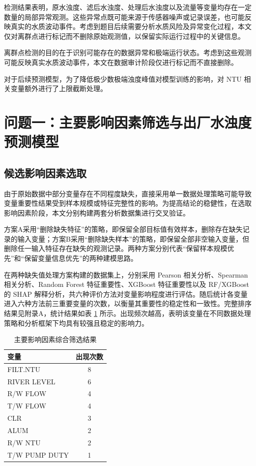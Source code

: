 \documentclass[UTF8,zihao=-4]{ctexart}
\begin{document}
检测结果表明，原水浊度、滤后水浊度、处理后水浊度以及流量等变量均存在一定数量的局部异常观测。这些异常点既可能来源于传感器噪声或记录误差，也可能反映真实的水质波动事件。考虑到题目后续需要分析水质风险及异常变化过程，本文仅对离群点进行标记而不删除原始观测值，以保留实际运行过程中的关键信息。

离群点检测的目的在于识别可能存在的数据异常和极端运行状态。考虑到这些观测可能反映真实水质波动事件，本文在数据审计阶段仅进行标记而不直接删除。

对于后续预测模型，为了降低极少数极端浊度峰值对模型训练的影响，对 NTU 相关变量额外进行了上限截断处理。
\section{问题一：主要影响因素筛选与出厂水浊度预测模型}

\subsection{候选影响因素选取}
由于原始数据中部分变量存在不同程度缺失，直接采用单一数据处理策略可能导致变量重要性结果受到样本规模或特征完整性的影响。为提高结论的稳健性，在选取影响因素阶段，本文分别构建两套分析数据集进行交叉验证。

方案A采用“删除缺失特征”的策略，即保留全部目标值有效样本，删除存在缺失记录的输入变量；方案B采用“删除缺失样本”的策略，即保留全部非空输入变量，但删除任一输入特征存在缺失的观测记录。两种方案分别代表“保留样本规模优先”和“保留变量信息优先”的两种建模思路。

在两种缺失值处理方案构建的数据集上，分别采用 Pearson 相关分析、Spearman 相关分析、Random Forest 特征重要性、XGBoost 特征重要性以及 RF/XGBoost 的 SHAP 解释分析，共六种评价方法对变量影响程度进行评估。随后统计各变量进入六种方法前三重要变量的次数，以衡量其重要性的稳定性和一致性。完整排序结果见附录A，统计结果如表 \ref{tab:vote} 所示。出现频次越高，表明该变量在不同数据处理策略和分析框架下均具有较强且稳定的影响力。

\begin{table}[H]
\centering
\caption{主要影响因素综合筛选结果}
\label{tab:vote}
\begin{tabular}{lc}
\toprule
变量 & 出现次数 \\
\midrule
FILT.NTU & 8 \\
RIVER LEVEL & 6 \\
R/W FLOW & 4 \\
T/W FLOW & 4 \\
CLR & 3 \\
ALUM & 2 \\
R/W NTU & 2 \\
T/W PUMP DUTY & 1 \\
\bottomrule
\end{tabular}
\end{table}
\end{document}
